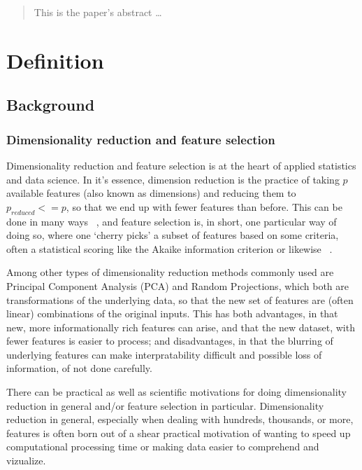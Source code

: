 \documentclass[12pt]{article}
\begin{document}
\maketitle


\begin{abstract}
This is the paper's abstract \ldots
\end{abstract}

\tableofcontents


\section{Definition}\label{definition}

\subsection{Background}

\subsubsection{Dimensionality reduction and feature selection}

Dimensionality reduction and feature selection is at the heart of applied statistics and data science. In it's essence, dimension reduction is the practice of taking $p$ available features (also known as dimensions) and reducing them to $p_{reduced} <= p$, so that we end up with fewer features than before. This can be done in many ways ~\cite{wiki:dimred}, and feature selection is, in short, one particular way of doing so, where one `cherry picks' a subset of features based on some criteria, often a statistical scoring like the Akaike information criterion or likewise ~\cite{wiki:feature}.

Among other types of dimensionality reduction methods commonly used are Principal Component Analysis (PCA) and Random Projections, which both are transformations of the underlying data, so that the new set of features are (often linear) combinations of the original inputs. This has both advantages, in that new, more informationally rich features can arise, and that the new dataset, with fewer features is easier to process; and disadvantages, in that the blurring of underlying features can make interpratability difficult and possible loss of information, of not done carefully.

There can be practical as well as scientific motivations for doing dimensionality reduction in general and/or feature selection in particular. Dimensionality reduction in general, especially when dealing with hundreds, thousands, or more, features is often born out of a shear practical motivation of wanting to speed up computational processing time or making data easier to comprehend and vizualize.
\end{document}

